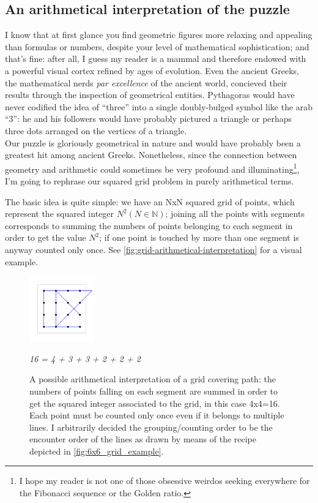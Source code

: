 \documentclass[11pt]{article}
\newcommand{\quotes}[1]{``#1''}
\begin{document}
\hypertarget{arithmetical-interpretation} {
	\subsection{An arithmetical interpretation of the puzzle}
	\label{arithmetical-interpretation}
}
I know that at first glance you find geometric figures more relaxing and appealing than formulas or numbers, despite your level of mathematical sophistication; and that's fine: after all, I guess my reader is a mammal and therefore endowed with a powerful visual cortex refined by ages of evolution. Even the ancient Greeks, the mathematical nerds \emph{par excellence} of the ancient world, concieved their results through the inspection of geometrical entities. Pythagoras would have never codified the idea of \quotes{three} into a single doubly-bulged symbol like the arab \quotes{3}: he and his followers would have probably pictured a triangle or perhaps three dots arranged on the vertices of a triangle.\\
Our puzzle is gloriously geometrical in nature and would have probably been a greatest hit among ancient Greeks. Nonetheless, since the connection between geometry and arithmetic could sometimes be very profound and illuminating\footnote{I hope my reader is not one of those obsessive weirdos seeking everywhere for the Fibonacci sequence or the Golden ratio.}, I'm going to rephrase our squared grid problem in purely arithmetical terms.

The basic idea is quite simple: we have an NxN squared grid of points, which represent the squared integer $N^{2} (N \in \mathbb{N})$; joining all the points with segments corresponds to summing the numbers of points belonging to each segment in order to get the value $N^2$; if one point is touched by more than one segment is anyway counted only once. See \autoref{fig:grid-arithmetical-interpretation} for a visual example.
\begin{figure}[H]
\centering
\includegraphics[width=0.25\textwidth]{images/4x4_grid_iteration_solution.png}
\caption*{\emph{16 = 4 + 3 + 3 + 2 + 2 + 2}}
\caption{A possible arithmetical interpretation of a grid covering path: the numbers of points falling on each segment are summed in order to get the squared integer associated to the grid, in this case 4x4=16. Each point must be counted only once even if it belongs to multiple lines. I arbitrarily decided the grouping/counting order to be the encounter order of the lines as drawn by means of the recipe depicted in \autoref{fig:6x6_grid_example}.}
\label{fig:grid-arithmetical-interpretation}
\end{figure}
\end{document}
